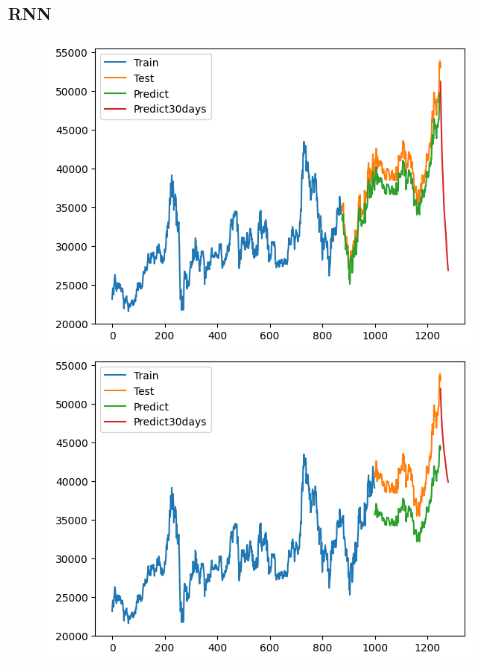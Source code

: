 \subsubsection{RNN}
\begin{figure}[H]
    \centering
    \begin{minipage}{0.15\textwidth}
    \centering
    \includegraphics[width=1\textwidth]{resources/chapter-5/result/BIDV_ RNN_7-3.png}
    \end{minipage}
    \hfill
    \begin{minipage}{0.15\textwidth}
    \centering
    \includegraphics[width=1\textwidth]{resources/chapter-5/result/BIDV_ RNN_8-2.png}
    \end{minipage}
    \hfill
        \begin{minipage}{0.15\textwidth}

\end{minipage}
\end{figure}
